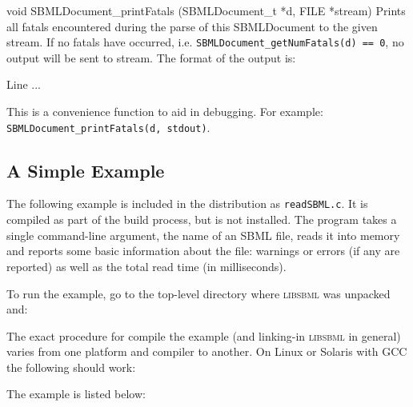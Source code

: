 \documentclass{cekmanual}
\begin{document}
\begin{methoddef}{void SBMLDocument\_printFatals (SBMLDocument\_t *d,
FILE *stream)}
  Prints all fatals encountered during the parse of this SBMLDocument
  to the given stream.  If no fatals have occurred, i.e.
  \texttt{SBMLDocument\_getNumFatals(d) == 0}, no output will be sent
  to stream. The format of the output is:
  \begin{example}
      Line %
      ...
  \end{example}
  This is a convenience function to aid in debugging.  For example:
  \texttt{SBMLDocument\_printFatals(d, stdout)}.
 \end{methoddef}


\subsection{A Simple Example}
\label{sec:read-example}

The following example is included in the distribution as
\texttt{readSBML.c}.  It is compiled as part of the build process, but
is not installed.  The program takes a single command-line argument,
the name of an SBML file, reads it into memory and reports some basic
information about the file: warnings or errors (if any are reported)
as well as the total read time (in milliseconds).

To run the example, go to the top-level directory where
\textsc{libsbml} was unpacked and:

\begin{example}
\end{example}


The exact procedure for compile the example (and linking-in
\textsc{libsbml} in general) varies from one platform and compiler to
another.  On Linux or Solaris with GCC the following should work:

\begin{example}
\end{example}


The example is listed below:
\\
\end{document}
